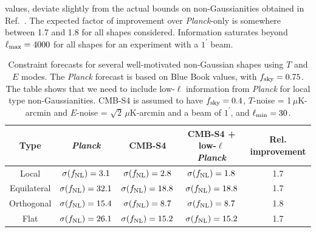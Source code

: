 values, deviate slightly from the actual bounds on non-Gaussianities obtained in Ref.~\cite{Ade:2015ava}. The expected factor of improvement over {\it Planck}-only is somewhere between 1.7 and 1.8 for all shapes considered. Information saturates beyond $\ell_{\rm max} = 4000$ for all shapes for an experiment with a $1^\prime$ beam. 

\begin{table}[t]
  \begin{center}
    \begin{tabular}{ | c || c | c | c | c |}
      \hline
      Type & {\it Planck} & CMB-S4 & CMB-S4 + low-$\ell$ {\it Planck} & Rel. improvement \\ \hline \hline
      Local & $\sigma(f_{\rm NL}) = 3.1$ & $\sigma(f_{\rm NL}) = 2.8$ &  $\sigma(f_{\rm NL}) = 1.8$ & 1.7\\ \hline 
      Equilateral &  $\sigma(f_{\rm NL}) = 32.1$ & $\sigma(f_{\rm NL}) = 18.8$ &  $\sigma(f_{\rm NL}) = 18.8$ & 1.7\\ \hline 
      Orthogonal &  $\sigma(f_{\rm NL}) = 15.4$ & $\sigma(f_{\rm NL}) = 8.7$ &  $\sigma(f_{\rm NL}) = 8.7$ & 1.8\\ \hline 
      Flat &  $\sigma(f_{\rm NL}) = 26.1$ & $\sigma(f_{\rm NL}) = 15.2$ &  $\sigma(f_{\rm NL}) = 15.2$ & 1.7\\ \hline 
    \end{tabular}
  \end{center}
  \caption{Constraint forecasts for several well-motivated non-Gaussian shapes using $T$ and $E$ modes. The {\it Planck\/} forecast is based on Blue Book values, with $f_{\rm sky} = 0.75$. The table shows that we need to include low-$\ell$ information from {\it Planck\/} for local type non-Gaussianities. CMB-S4 is assumed to have $f_{\rm sky} = 0.4$, $T$-noise = 1$\,\mu$K-arcmin and $E$-noise = $\sqrt{2}\,\mu$K-arcmin and a beam of $1^\prime$, and $\ell_{\rm min} = 30$.}
  \label{tab:fnl_forecast}
\end{table}

